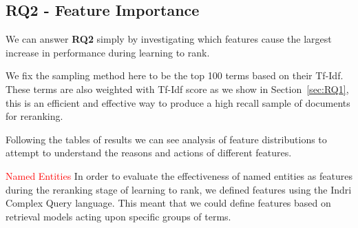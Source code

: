 \documentclass{mpaper}
\newcommand{\remove}[1]{\textcolor{red}{#1}}
\begin{document}
\subsection{RQ2 - Feature Importance}
We can answer \textbf{RQ2} simply by investigating which features cause the largest increase in performance during learning to rank.

We fix the sampling method here to be the top 100 terms based on their Tf-Idf. These terms are also weighted with Tf-Idf score as we show in Section~\ref{sec:RQ1}, this is an efficient and effective way to produce a high recall sample of documents for reranking.

Following the tables of results we can see analysis of feature distributions to attempt to understand the reasons and actions of different features.

\remove{Named Entities}
In order to evaluate the effectiveness of named entities as features during the reranking stage of learning to rank, we defined features using the Indri Complex Query language.
This meant that we could define features based on retrieval models acting upon specific groups of terms.

\begin{center}
\begin{table}[h]
\centering
{}
\caption{Named Entity Features During Learning To Rank}
\label{ne_results}
\end{table}
\end{center}
\end{document}
